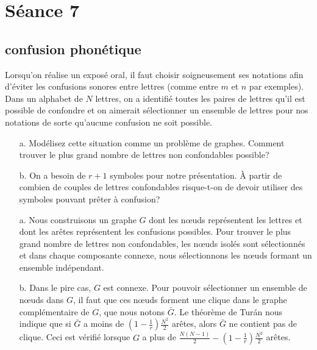 %

\section{Séance 7}

\subsection{confusion phonétique}
Lorsqu'on réalise un exposé oral, il faut choisir soigneusement ses notations afin d'éviter les confusions sonores entre lettres (comme entre $m$ et $n$ par exemples). Dans un alphabet de $N$ lettres, on a identifié toutes les paires de lettres qu'il est possible de confondre et on aimerait sélectionner un ensemble de lettres pour nos notations de sorte qu'aucune confusion ne soit possible.

\begin{enumerate}
  \item[a.] Modélisez cette situation comme un problème de graphes. Comment trouver le plus grand nombre de lettres non confondables possible?
  \item[b.] On a besoin de $r+1$ symboles pour notre présentation. À partir de combien de couples de lettres confondables risque-t-on de devoir utiliser des symboles pouvant prêter à confusion?
\end{enumerate}

\begin{solution}
\begin{enumerate}
\item[a.]
Nous construisons un graphe $G$ dont les nœuds représentent les lettres et dont les arêtes représentent les confusions possibles. Pour trouver le plus grand nombre de lettres non confondables, les nœuds isolés sont sélectionnés et dans chaque composante connexe, nous sélectionnons les nœuds formant un ensemble indépendant.

\item[b.]
Dans le pire cas, $G$ est connexe. Pour pouvoir sélectionner un ensemble de nœuds dans $G$, il faut que ces nœuds forment une clique dans le graphe complémentaire de $G$, que nous notons $\bar{G}$. Le théorème de Turán nous indique que si $\bar{G}$ a moins de $\left(1-\frac{1}{r}\right)\frac{N^2}{2}$ arêtes, alors $\bar{G}$ ne contient pas de clique. Ceci est vérifié lorsque $G$ a plus de $\frac{N(N-1)}{2}-\left(1-\frac{1}{r}\right)\frac{N^2}{2}$ arêtes.

\end{enumerate}
\end{solution}

